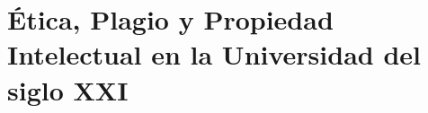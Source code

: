 
\section[Ética, Plagio y Propiedad Intelectual]{Ética, Plagio y Propiedad Intelectual en la Universidad del siglo XXI}

